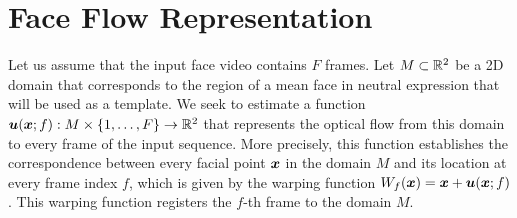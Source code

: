 \section{Face Flow Representation}\label{sec:method}
Let us assume that the input face video contains $F$ frames. Let $M\subset\mathbb{R}^2$
be a 2D domain that corresponds to the region of a mean face in neutral expression
that will be used as a template. We seek to estimate a function
$\boldsymbol{u}(\boldsymbol{x};f) : M\times \{1,\ldots,F\} \rightarrow \mathbb{R}^2$ that represents the
optical flow from this domain to every frame of the input sequence.
More precisely, this function establishes the correspondence between every
facial point $\boldsymbol{x}$ in the domain $M$ and its location at every frame index $f$,
which is given by the warping function $W_f(\boldsymbol{x})=\boldsymbol{x}+\boldsymbol{u}(\boldsymbol{x};f)$. This warping
function registers the $f$-th frame to the domain $M$.


